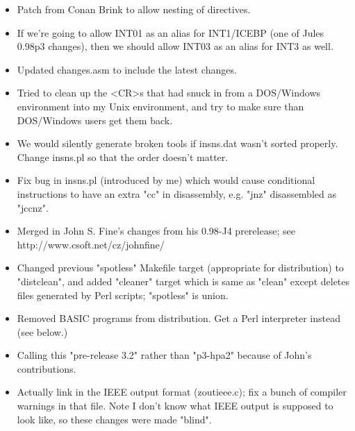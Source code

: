 
\begin{itemize}
    \item{Patch from Conan Brink to allow nesting of  directives.}
    \item{If we're going to allow INT01 as an alias for INT1/ICEBP (one of
        Jules 0.98p3 changes), then we should allow INT03 as an alias for INT3
        as well.}
    \item{Updated changes.asm to include the latest changes.}
    \item{Tried to clean up the <CR>s that had snuck in from a DOS/Windows
        environment into my Unix environment, and try to make sure than
        DOS/Windows users get them back.}
    \item{We would silently generate broken tools if insns.dat wasn't sorted
        properly. Change insns.pl so that the order doesn't matter.}
    \item{Fix bug in insns.pl (introduced by me) which would cause conditional
        instructions to have an extra "cc" in disassembly, e.g. "jnz"
        disassembled as "jccnz".}
\end{itemize}


\begin{itemize}
    \item{Merged in John S. Fine's changes from his 0.98-J4 prerelease; see
        http://www.csoft.net/cz/johnfine/}
    \item{Changed previous "spotless" Makefile target (appropriate for distribution)
        to "distclean", and added "cleaner" target which is same as "clean"
        except deletes files generated by Perl scripts; "spotless" is union.}
    \item{Removed BASIC programs from distribution. Get a Perl interpreter
        instead (see below.)}
    \item{Calling this "pre-release 3.2" rather than "p3-hpa2" because of
        John's contributions.}
    \item{Actually link in the IEEE output format (zoutieee.c); fix a bunch of
        compiler warnings in that file. Note I don't know what IEEE output
        is supposed to look like, so these changes were made "blind".}
\end{itemize}


